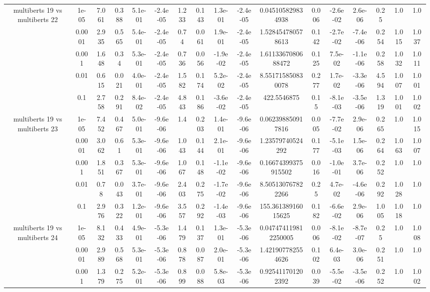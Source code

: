 \begin{tabular}{|c|c|c|c|c|c|c|c|c|c|c|c|c|c|c|c|c|}
\hline
\multirow{5}{*}{multiberts 19 vs multiberts 22} & 1e-05 & 7.061 & 0.388 & 5.1e-01 & -2.4e-05 & 1.233 & 0.143 & 1.3e-01 & -2.4e-05 & 0.045105829834938 & 0.006 & -2.6e-02 & 2.6e-06 & 0.25 & 1.0 & 1.0 \\
 & 0.0001 & 2.935 & 0.565 & 5.4e-01 & -2.4e-05 & 0.74 & 0.061 & 1.9e-01 & -2.4e-05 & 1.528454780578613 & 0.142 & -2.7e-02 & -7.4e-06 & 0.254 & 1.015 & 1.037 \\
 & 0.001 & 1.648 & 0.34 & 5.3e-01 & -2.4e-05 & 0.736 & 0.056 & -1.9e-02 & -2.4e-05 & 1.6113367080688472 & 0.125 & 7.5e-02 & -1.1e-06 & 0.258 & 1.032 & 1.011 \\
 & 0.01 & 0.615 & 0.021 & 4.0e-01 & -2.4e-05 & 1.582 & 0.174 & 5.2e-02 & -2.4e-05 & 8.551715850830078 & 0.277 & 1.7e-02 & -3.3e-06 & 4.594 & 1.007 & 1.001 \\
 & 0.1 & 2.758 & 0.291 & 8.4e-02 & -2.4e-05 & 4.843 & 0.186 & -3.6e-02 & -2.4e-05 & 422.5546875 & 0.15 & -8.1e-03 & -3.5e-06 & 1.319 & 1.001 & 1.002 \\
\hline
\multirow{5}{*}{multiberts 19 vs multiberts 23} & 1e-05 & 7.452 & 0.467 & 5.0e-01 & -9.6e-06 & 1.4 & 0.203 & 1.4e-01 & -9.6e-06 & 0.062398850917816 & 0.005 & -7.7e-02 & 2.9e-06 & 0.265 & 1.0 & 1.015 \\
 & 0.0001 & 3.062 & 0.61 & 5.3e-01 & -9.6e-06 & 1.043 & 0.144 & 2.1e-01 & -9.6e-06 & 1.23579740524292 & 0.177 & -5.1e-03 & 1.5e-06 & 0.264 & 1.063 & 1.007 \\
 & 0.001 & 1.851 & 0.367 & 5.3e-01 & -9.6e-06 & 1.067 & 0.148 & -1.1e-02 & -9.6e-06 & 0.16674399375915502 & 0.016 & -1.0e-01 & 3.7e-06 & 0.252 & 1.0 & 1.0 \\
 & 0.01 & 0.78 & 0.043 & 3.7e-01 & -9.6e-06 & 2.403 & 0.275 & -1.7e-02 & -9.6e-06 & 8.505130767822266 & 0.25 & 4.7e-02 & -4.6e-06 & 0.292 & 1.028 & 1.0 \\
 & 0.1 & 2.976 & 0.322 & 1.2e-01 & -9.6e-06 & 3.557 & 0.292 & -1.4e-03 & -9.6e-06 & 155.36138916015625 & 0.182 & -6.6e-02 & 2.9e-06 & 1.005 & 1.018 & 1.0 \\
\hline
\multirow{5}{*}{multiberts 19 vs multiberts 24} & 1e-05 & 8.132 & 0.433 & 4.9e-01 & -5.3e-06 & 1.479 & 0.137 & 1.3e-01 & -5.3e-06 & 0.047474119812250005 & 0.006 & -8.1e-02 & -8.7e-07 & 0.25 & 1.0 & 1.008 \\
 & 0.0001 & 2.989 & 0.568 & 5.3e-01 & -5.3e-06 & 0.878 & 0.087 & 2.0e-01 & -5.3e-06 & 1.421907782554626 & 0.102 & 6.4e-03 & 3.0e-06 & 0.251 & 1.0 & 1.0 \\
 & 0.001 & 1.379 & 0.275 & 5.2e-01 & -5.3e-06 & 0.899 & 0.088 & 5.8e-03 & -5.3e-06 & 0.925411701202392 & 0.039 & -5.5e-02 & -3.5e-06 & 0.252 & 1.0 & 1.002 \\

\end{tabular}
